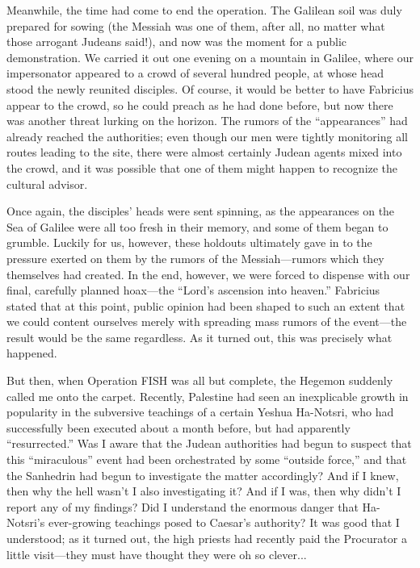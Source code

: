 Meanwhile, the time had come to end the operation. The Galilean soil was duly prepared for sowing (the Messiah was one of them, after all, no matter what those arrogant Judeans said!), and now was the moment for a public demonstration. We carried it out one evening on a mountain in Galilee, where our impersonator appeared to a crowd of several hundred people, at whose head stood the newly reunited disciples. Of course, it would be better to have Fabricius appear to the crowd, so he could preach as he had done before, but now there was another threat lurking on the horizon. The rumors of the ``appearances'' had already reached the authorities; even though our men were tightly monitoring all routes leading to the site, there were almost certainly Judean agents mixed into the crowd, and it was possible that one of them might happen to recognize the cultural advisor.

Once again, the disciples' heads were sent spinning, as the appearances on the Sea of Galilee were all too fresh in their memory, and some of them began to grumble. Luckily for us, however, these holdouts ultimately gave in to the pressure exerted on them by the rumors of the Messiah---rumors which they themselves had created. In the end, however, we were forced to dispense with our final, carefully planned hoax---the ``Lord's ascension into heaven.'' Fabricius stated that at this point, public opinion had been shaped to such an extent that we could content ourselves merely with spreading mass rumors of the event---the result would be the same regardless. As it turned out, this was precisely what happened.

But then, when Operation FISH was all but complete, the Hegemon suddenly called me onto the carpet. Recently, Palestine had seen an inexplicable growth in popularity in the subversive teachings of a certain Yeshua Ha-Notsri, who had successfully been executed about a month before, but had apparently ``resurrected.'' Was I aware that the Judean authorities had begun to suspect that this ``miraculous'' event had been orchestrated by some ``outside force,'' and that the Sanhedrin had begun to investigate the matter accordingly? And if I knew, then why the hell wasn't I also investigating it? And if I was, then why didn't I report any of my findings? Did I understand the enormous danger that Ha-Notsri's ever-growing teachings posed to Caesar's authority? It was good that I understood; as it turned out, the high priests had recently paid the Procurator a little visit---they must have thought they were oh so clever...

